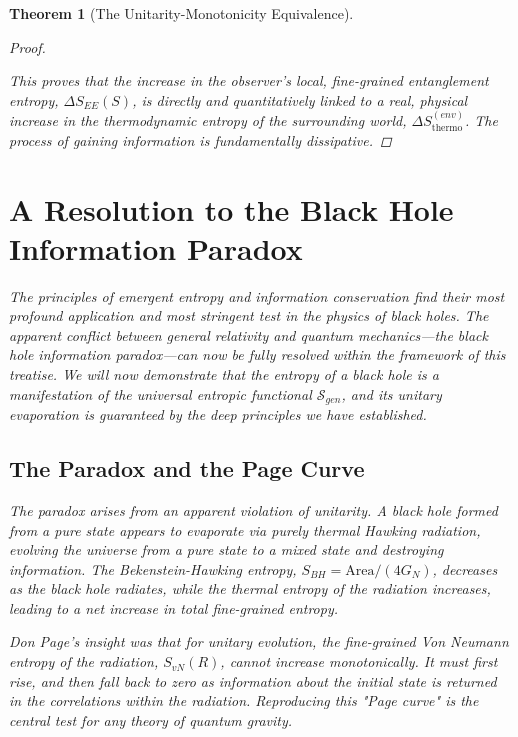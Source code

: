 \documentclass[11pt, letterpaper]{report}
\theoremstyle{plain} %
\newtheorem{theorem}{Theorem}[chapter]
\theoremstyle{definition} %
\theoremstyle{remark} %
\begin{document}
\begin{theorem}[The Unitarity-Monotonicity Equivalence]
\begin{proof}
\begin{enumerate}
\end{enumerate}
This proves that the increase in the observer's local, fine-grained entanglement entropy, $\Delta S_{EE}(S)$, is directly and quantitatively linked to a real, physical increase in the thermodynamic entropy of the surrounding world, $\Delta S_{\text{thermo}}^{(env)}$. The process of gaining information is fundamentally dissipative.
\end{proof}







\section{A Resolution to the Black Hole Information Paradox}
\label{sec:bh_info_paradox_resolution}

The principles of emergent entropy and information conservation find their most profound application and most stringent test in the physics of black holes. The apparent conflict between general relativity and quantum mechanics—the black hole information paradox—can now be fully resolved within the framework of this treatise. We will now demonstrate that the entropy of a black hole is a manifestation of the universal entropic functional $\mathcal{S}_{gen}$, and its unitary evaporation is guaranteed by the deep principles we have established.

\subsection{The Paradox and the Page Curve}
The paradox arises from an apparent violation of unitarity. A black hole formed from a pure state appears to evaporate via purely thermal Hawking radiation, evolving the universe from a pure state to a mixed state and destroying information. The Bekenstein-Hawking entropy, $S_{BH} = \text{Area}/(4G_N)$, decreases as the black hole radiates, while the thermal entropy of the radiation increases, leading to a net increase in total fine-grained entropy.

Don Page's insight was that for unitary evolution, the fine-grained Von Neumann entropy of the radiation, $S_{vN}(R)$, cannot increase monotonically. It must first rise, and then fall back to zero as information about the initial state is returned in the correlations within the radiation. Reproducing this "Page curve" is the central test for any theory of quantum gravity.


\end{theorem}
\end{document}
